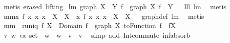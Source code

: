 \begin{isabellebody}
\ {\isacharparenleft}metis\ {\isacharparenleft}erased{\isacharcomma}\ lifting{\isacharparenright}{\isacharparenright}%
\endisatagproof
{\isafoldproof}%
%
\isadelimproof
%
\endisadelimproof
\isanewline
{}\isamarkupfalse%
\ lm{}{}{\isacharcolon}\ {\isachardoublequoteopen}graph\ {\isacharparenleft}X\ {\isasyminter}\ Y{\isacharparenright}\ f\ {\isacharequal}\ graph\ X\ f\ {\isacharbar}{\isacharbar}\ Y{\isachardoublequoteclose}%
\isadelimproof
\ %
\endisadelimproof
%
\isatagproof
{}\isamarkupfalse%
\ lll{}{}\ lm{}{}\ \isamarkupfalse%
\ metis%
\endisatagproof
{\isafoldproof}%
%
\isadelimproof
%
\endisadelimproof
\isanewline
{}\isamarkupfalse%
\ mm{}{}{\isacharcolon}{\isachardoublequoteopen}{\isacharbraceleft}{\isacharparenleft}x{\isacharcomma}\ f\ x{\isacharparenright}{\isacharbar}\ x{\isachardot}\ x\ {\isasymin}\ X{}{\isacharbraceright}\ {\isacharbar}{\isacharbar}\ X{}\ {\isacharequal}\ {\isacharbraceleft}{\isacharparenleft}x{\isacharcomma}\ f\ x{\isacharparenright}{\isacharbar}\ x{\isachardot}\ x\ {\isasymin}\ X{}\ {\isasyminter}\ X{}{\isacharbraceright}{\isachardoublequoteclose}%
\isadelimproof
\ %
\endisadelimproof
%
\isatagproof
{}\isamarkupfalse%
\ graph{\isacharunderscore}def\ lm{}{}\ \isamarkupfalse%
\ metis%
\endisatagproof
{\isafoldproof}%
%
\isadelimproof
%
\endisadelimproof
\isanewline
\isanewline
{}\isamarkupfalse%
\ mm{}{}{\isacharcolon}\ \ {\isachardoublequoteopen}runiq\ f{\isachardoublequoteclose}\ {\isachardoublequoteopen}X\ {\isasymsubseteq}\ Domain\ f{\isachardoublequoteclose}\ \ {\isachardoublequoteopen}graph\ X\ {\isacharparenleft}toFunction\ f{\isacharparenright}\ {\isacharequal}\ {\isacharparenleft}f{\isacharbar}{\isacharbar}X{\isacharparenright}{\isachardoublequoteclose}\ \isanewline
%
\isadelimproof
%
\endisadelimproof
%
\isatagproof
{}\isamarkupfalse%
\ {\isacharminus}\isanewline
\ \ \isamarkupfalse%
\ {\isachardoublequoteopen}{\isasymAnd}v\ w{\isachardot}\ {\isacharparenleft}v{\isasymColon}{\isacharprime}a\ set{\isacharparenright}\ {\isasymsubseteq}\ w\ {\isasymlongrightarrow}\ w\ {\isasyminter}\ v\ {\isacharequal}\ v{\isachardoublequoteclose}\ \isamarkupfalse%
\ {\isacharparenleft}simp\ add{\isacharcolon}\ Int{\isacharunderscore}commute\ inf{\isachardot}absorb{}{\isacharparenright}\isanewline

\end{isabellebody}
